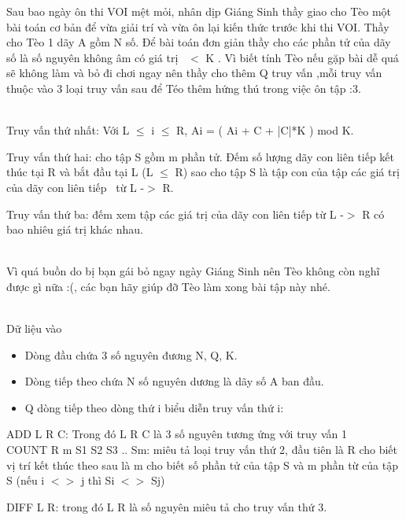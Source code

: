 







     Sau bao ngày ôn thi VOI mệt mỏi, nhân dịp Giáng Sinh thầy giao cho Tèo một bài toán cơ bản để vừa giải trí và vừa ôn lại kiến thức trước khi thi VOI. Thầy cho Tèo 1 dãy A gồm N số. Để bài toán đơn giản thầy cho các phần tử của dãy số là số nguyên không âm có giá trị  $<$ K . Vì biết tính Tèo nếu gặp bài dễ quá sẽ không làm và bỏ đi chơi ngay nên thầy cho thêm Q truy vấn ,mỗi truy vấn thuộc vào 3 loại truy vấn sau để Téo thêm hứng thú trong việc ôn tập :3.    


\\

     Truy vấn thứ nhất: Với L  $\le$  i  $\le$  R, Ai = ( Ai + C + |C|*K ) mod K.    

     Truy vấn thứ hai: cho tập S gồm m phần tử. Đếm số lượng dãy con liên tiếp kết thúc tại R và bắt đầu tại L (L  $\le$  R) sao cho tập S là tập con của tập các giá trị của dãy con liên tiếp  từ L -$>$ R.    

     Truy vấn thứ ba: đếm xem tập các giá trị của dãy con liên tiếp từ L -$>$ R có bao nhiêu giá trị khác nhau.    


\\

     Vì quá buồn do bị bạn gái bỏ ngay ngày Giáng Sinh nên Tèo không còn nghĩ được gì nữa :(, các bạn hãy giúp đỡ Tèo làm xong bài tập này nhé.    


\\

     Dữ liệu vào    
\begin{itemize}
	\item      Dòng đầu chứa 3 số nguyên đương N, Q, K.    
	\item      Dòng tiếp theo chứa N số nguyên dương là dãy số A ban đầu.    
	\item      Q dòng tiếp theo dòng thứ i biểu diễn truy vấn thứ i:    
\end{itemize}

     ADD L R C: Trong đó L R C là 3 số nguyên tương ứng với truy vấn 1     
\\     COUNT R m S1 S2 S3 .. Sm: miêu tả loại truy vấn thứ 2, đầu tiên là R cho biết vị trí kết thúc theo sau là m cho biết số phần tử của tập S và m phần từ của tập S (nếu i $<$$>$ j thì Si $<$$>$ Sj)    

     DIFF L R: trong đó L R là số nguyên miêu tả cho truy vấn thứ 3.    


